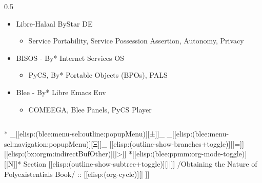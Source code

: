 \begin{whenOrg}
\begin{verblatex}
\begin{frame}[fragile,plain,label=twoVolumesConcepts]
\begin{columns}
\begin{column}{0.5\textwidth}
        \begin{itemize}
          \item Libre-Halaal ByStar DE
                \begin{itemize}
                  \item Service Portability, Service Possession Assertion, Autonomy, Privacy
                \end{itemize}
          \item BISOS - By* Internet Services OS
                \begin{itemize}
                  \item PyCS, By* Portable Objects (BPOs), PALS
                \end{itemize}
          \item Blee - By* Libre Emacs Env
                \begin{itemize}
                  \item COMEEGA, Blee Panels, PyCS Player
                \end{itemize}
        \end{itemize}
      \end{column}

    \end{columns}




\end{frame}
\end{verblatex}



\begin{whenOrg}
*  _[[elisp:(blee:menu-sel:outline:popupMenu)][±]]_ _[[elisp:(blee:menu-sel:navigation:popupMenu)][Ξ]]_ [[elisp:(outline-show-branches+toggle)][|=]] [[elisp:(bx:orgm:indirectBufOther)][|>]] *[[elisp:(blee:ppmm:org-mode-toggle)][|N]]*  Section    [[elisp:(outline-show-subtree+toggle)][||]]   /Obtaining the Nature of Polyexistentials Book/ ::  [[elisp:(org-cycle)][| ]]
\end{whenOrg}


\end{whenOrg}
